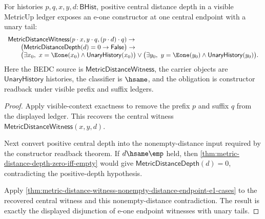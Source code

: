 \begin{theorem}
\label{thm:metric-distance-witness-visible-context-positive-depth-e1-endpoint-cases}
For histories $p,q,x,y,d:\mathsf{BHist}$, positive central distance depth in a
visible MetricUp ledger exposes an e-one constructor at one central endpoint
with a unary tail:
$$
\begin{array}{l}
\mathsf{MetricDistanceWitness}(p\cdot x,y\cdot q,(p\cdot d)\cdot q)\to\\
\qquad
\bigl(\mathsf{MetricDistanceDepth}(d)=0\to\mathsf{False}\bigr)\to\\
\qquad
\bigl(\exists x_0,\ x=\Eone(x_0)\land\mathsf{UnaryHistory}(x_0)\bigr)
\vee
\bigl(\exists y_0,\ y=\Eone(y_0)\land\mathsf{UnaryHistory}(y_0)\bigr).
\end{array}
$$
Here the BEDC source is $\mathsf{MetricDistanceWitness}$, the carrier objects
are $\mathsf{UnaryHistory}$ histories, the classifier is $\hsame$, and the
obligation is constructor readback under visible prefix and suffix ledgers.
\end{theorem}
\begin{proof}
Apply visible-context exactness to remove the prefix $p$ and suffix $q$ from
the displayed ledger. This recovers the central witness
$\mathsf{MetricDistanceWitness}(x,y,d)$.

Next convert positive central depth into the nonempty-distance input required
by the constructor readback theorem. If $d\hsame\emp$ held, then
\autoref{thm:metric-distance-depth-zero-iff-empty} would give
$\mathsf{MetricDistanceDepth}(d)=0$, contradicting the positive-depth
hypothesis.

Apply
\autoref{thm:metric-distance-witness-nonempty-distance-endpoint-e1-cases} to
the recovered central witness and this nonempty-distance contradiction. The
result is exactly the displayed disjunction of e-one endpoint witnesses with
unary tails.
\end{proof}
